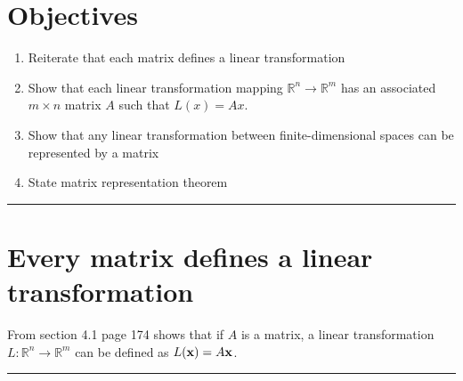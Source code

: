 %


\section*{Objectives}
\begin{enumerate}
	\item Reiterate that each matrix defines a linear transformation
	\item Show that each linear transformation mapping $\mathbb{R}^n \to \mathbb{R}^m$ has an associated $m \times n$ matrix $A$ such that $L(x) = Ax$.
	\item Show that any linear transformation between finite-dimensional spaces can be represented by a matrix
	\item State matrix representation theorem
    
\end{enumerate}






\rule[0.01in]{\textwidth}{0.0025in}


\section{Every matrix defines a linear transformation}
From section 4.1 page 174 shows that if $A$ is a matrix,  a linear transformation $L: \mathbb{R}^n \to \mathbb{R}^m$ can be defined as $L({\bf x}) = A {\bf x}$. 




\rule[0.01in]{\textwidth}{0.0025in}


